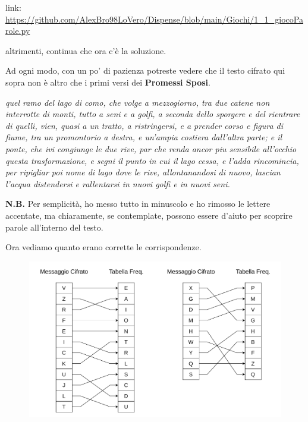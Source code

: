 \documentclass{report}
\begin{document}
link: \url{https://github.com/AlexBro98LoVero/Dispense/blob/main/Giochi/1_1_giocoParole.py}

altrimenti, continua che ora c'è la soluzione.

\newpage
Ad ogni modo, con un po' di pazienza potreste vedere che il testo cifrato qui sopra non è altro che i primi versi dei \textbf{Promessi Sposi}.

\vspace{0.2cm}
\textit{quel ramo del lago di como, che volge a mezzogiorno, tra due catene non interrotte di monti, tutto a seni e a golfi, a seconda dello sporgere e del rientrare di quelli, vien, quasi a un tratto, a ristringersi, e a prender corso e figura di fiume, tra un promontorio a destra, e un’ampia costiera dall’altra parte; e il ponte, che ivi congiunge le due rive, par che renda ancor piu sensibile all’occhio questa trasformazione, e segni il punto in cui il lago cessa, e l’adda rincomincia, per ripigliar poi nome di lago dove le rive, allontanandosi di nuovo, lascian l’acqua distendersi e rallentarsi in nuovi golfi e in nuovi seni. }
\vspace{0.2cm}


\textbf{N.B.} Per semplicità, ho messo tutto in minuscolo e ho rimosso le lettere accentate, ma chiaramente, se contemplate, possono essere d'aiuto per scoprire parole all'interno del testo.

\vspace{0.2cm}

Ora vediamo quanto erano corrette le corrispondenze.


\begin{figure}[h]

    \centering
    \includegraphics[width=\linewidth]{logos/1_5_cripto.pdf}

\end{figure}
\end{document}
